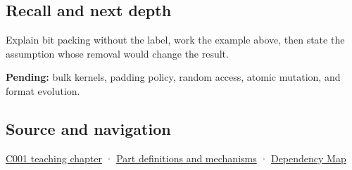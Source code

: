 \subsection{Recall and next depth}\label{appendix-1f9963e1a5d1-recall-and-next-depth}

Explain bit packing without the label, work the example above, then state the assumption whose removal would change the result.

\textbf{Pending:} bulk kernels, padding policy, random access, atomic mutation, and format evolution.

\subsection{Source and navigation}\label{appendix-1f9963e1a5d1-source-and-navigation}

\hyperref[01-foundations-i-ch001-from-a-signal-to-an-interpretation]{C001 teaching chapter} · \hyperref[appendix-fd090d982a15]{Part definitions and mechanisms} · \hyperref[appendix-4ad47bdd269a]{Dependency Map}
